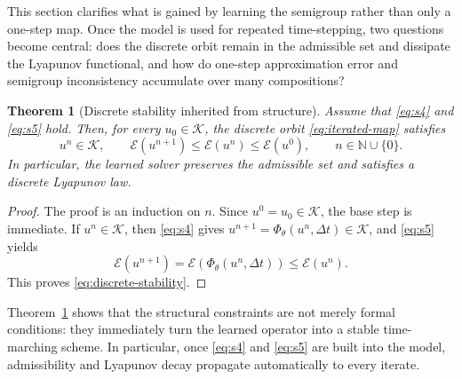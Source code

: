 \documentclass[11pt]{article}
\newtheorem{theorem}{Theorem}
\newcommand{\N}{\mathbb{N}}
\newcommand{\cK}{\mathcal{K}}
\newcommand{\cE}{\mathcal{E}}
\newcommand{\PhiT}{\Phi_{\theta}}
\begin{document}
This section clarifies what is gained by learning the semigroup rather than only a one-step map. Once the model is used for repeated time-stepping, two questions become central: does the discrete orbit remain in the admissible set and dissipate the Lyapunov functional, and how do one-step approximation error and semigroup inconsistency accumulate over many compositions?

\begin{theorem}[Discrete stability inherited from structure]\label{thm:stability}
Assume that \eqref{eq:s4} and \eqref{eq:s5} hold. Then, for every \(u_0\in \cK\), the discrete orbit \eqref{eq:iterated-map} satisfies
\begin{equation}\label{eq:discrete-stability}
u^n\in \cK, \qquad \cE(u^{n+1})\le \cE(u^n)\le \cE(u^0), \qquad n\in \N\cup\{0\}.
\end{equation}
In particular, the learned solver preserves the admissible set and satisfies a discrete Lyapunov law.
\end{theorem}

\begin{proof}
The proof is an induction on \(n\). Since \(u^0=u_0\in \cK\), the base step is immediate. If \(u^n\in \cK\), then \eqref{eq:s4} gives \(u^{n+1}=\PhiT(u^n,\Delta t)\in \cK\), and \eqref{eq:s5} yields
\begin{equation*}
\cE(u^{n+1})=\cE(\PhiT(u^n,\Delta t))\le \cE(u^n).
\end{equation*}
This proves \eqref{eq:discrete-stability}.
\end{proof}

Theorem~\ref{thm:stability} shows that the structural constraints are not merely formal conditions: they immediately turn the learned operator into a stable time-marching scheme. In particular, once \eqref{eq:s4} and \eqref{eq:s5} are built into the model, admissibility and Lyapunov decay propagate automatically to every iterate.
\end{document}
